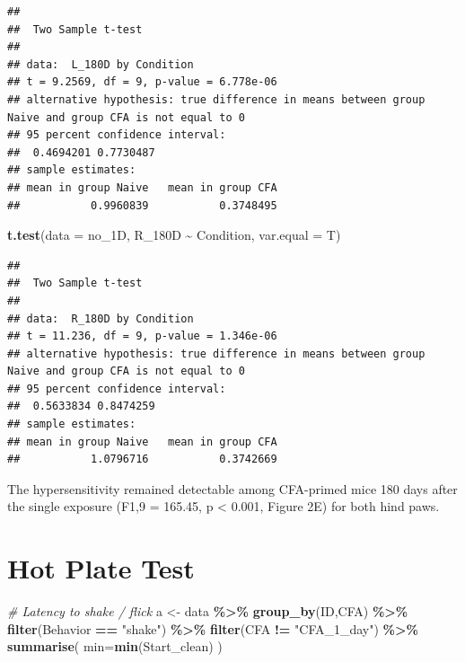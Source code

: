 \documentclass[
]{book}
\newenvironment{Shaded}{\begin{snugshade}}{\end{snugshade}}
\newcommand{\AttributeTok}[1]{\textcolor[rgb]{0.13,0.29,0.53}{#1}}
\newcommand{\CommentTok}[1]{\textcolor[rgb]{0.56,0.35,0.01}{\textit{#1}}}
\newcommand{\FunctionTok}[1]{\textcolor[rgb]{0.13,0.29,0.53}{\textbf{#1}}}
\newcommand{\NormalTok}[1]{#1}
\newcommand{\OtherTok}[1]{\textcolor[rgb]{0.56,0.35,0.01}{#1}}
\newcommand{\SpecialCharTok}[1]{\textcolor[rgb]{0.81,0.36,0.00}{\textbf{#1}}}
\newcommand{\StringTok}[1]{\textcolor[rgb]{0.31,0.60,0.02}{#1}}
\begin{document}
\begin{verbatim}
## 
##  Two Sample t-test
## 
## data:  L_180D by Condition
## t = 9.2569, df = 9, p-value = 6.778e-06
## alternative hypothesis: true difference in means between group Naive and group CFA is not equal to 0
## 95 percent confidence interval:
##  0.4694201 0.7730487
## sample estimates:
## mean in group Naive   mean in group CFA 
##           0.9960839           0.3748495
\end{verbatim}

\begin{Shaded}
\begin{Highlighting}[]
\FunctionTok{t.test}\NormalTok{(}\AttributeTok{data =}\NormalTok{ no\_1D, R\_180D }\SpecialCharTok{\textasciitilde{}}\NormalTok{ Condition, }\AttributeTok{var.equal =}\NormalTok{ T)}
\end{Highlighting}
\end{Shaded}

\begin{verbatim}
## 
##  Two Sample t-test
## 
## data:  R_180D by Condition
## t = 11.236, df = 9, p-value = 1.346e-06
## alternative hypothesis: true difference in means between group Naive and group CFA is not equal to 0
## 95 percent confidence interval:
##  0.5633834 0.8474259
## sample estimates:
## mean in group Naive   mean in group CFA 
##           1.0796716           0.3742669
\end{verbatim}

The hypersensitivity remained detectable among CFA-primed mice 180 days after the single exposure (F1,9 = 165.45, p \textless{} 0.001, Figure 2E) for both hind paws.

\section*{Hot Plate Test}\label{hot-plate-test}

\begin{Shaded}
\begin{Highlighting}[]
\CommentTok{\# Latency to shake / flick}
\NormalTok{a }\OtherTok{\textless{}{-}}\NormalTok{ data }\SpecialCharTok{\%\textgreater{}\%}
  \FunctionTok{group\_by}\NormalTok{(ID,CFA) }\SpecialCharTok{\%\textgreater{}\%}
  \FunctionTok{filter}\NormalTok{(Behavior }\SpecialCharTok{==} \StringTok{"shake"}\NormalTok{) }\SpecialCharTok{\%\textgreater{}\%}
  \FunctionTok{filter}\NormalTok{(CFA }\SpecialCharTok{!=} \StringTok{"CFA\_1\_day"}\NormalTok{) }\SpecialCharTok{\%\textgreater{}\%}
  \FunctionTok{summarise}\NormalTok{(}
    \AttributeTok{min=}\FunctionTok{min}\NormalTok{(Start\_clean)}
\NormalTok{  )}
\end{Highlighting}
\end{Shaded}
\end{document}
